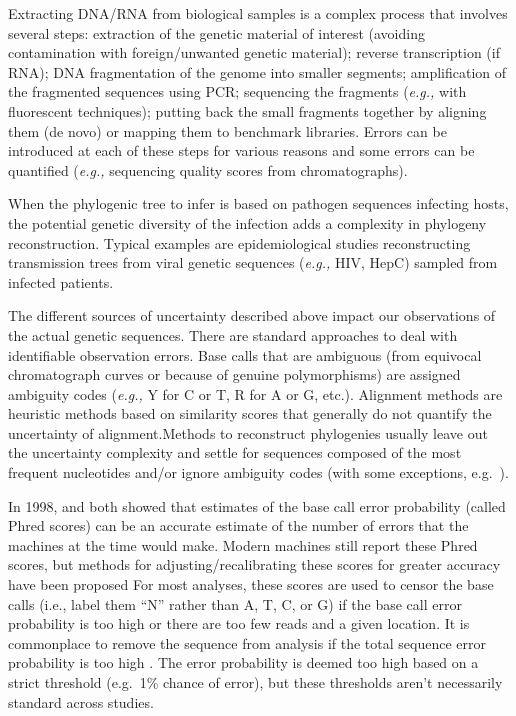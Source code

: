\documentclass[]{article}
\newcommand{\eg}{\textit{e.g.,}\xspace}
\begin{document}
Extracting DNA/RNA from biological samples is a complex process that
involves several steps: extraction of the genetic material of interest
(avoiding contamination with foreign/unwanted genetic material); reverse
transcription (if RNA); DNA fragmentation of the genome into smaller
segments; amplification of the fragmented sequences using PCR;
sequencing the fragments (\eg with fluorescent techniques); putting back
the small fragments together by aligning them (de novo) or mapping them
to benchmark libraries. Errors can be introduced at each of these steps
for various reasons \cite{beerenwinkelUltradeepSequencingAnalysis2011}
and some errors can be quantified (\eg sequencing quality scores from
chromatographs).

When the phylogenic tree to infer is based on pathogen sequences
infecting hosts, the potential genetic diversity of the infection adds a
complexity in phylogeny reconstruction. Typical examples are
epidemiological studies reconstructing transmission trees from viral
genetic sequences (\eg HIV, HepC) sampled from infected patients.

The different sources of uncertainty described above impact our
observations of the actual genetic sequences. There are standard
approaches to deal with identifiable observation errors. Base calls that
are ambiguous (from equivocal chromatograph curves or because of genuine
polymorphisms) are assigned ambiguity codes (\eg Y for C or T, R for A
or G, etc.). Alignment methods are heuristic methods based on similarity
scores that generally do not quantify the uncertainty of
alignment.Methods to reconstruct phylogenies usually leave out the
uncertainty complexity and settle for sequences composed of the most
frequent nucleotides and/or ignore ambiguity codes (with some
exceptions, e.g.~\citet{depristoFrameworkVariationDiscovery2011}).

In 1998, \citet{ewingBaseCallingAutomatedSequencer1998} and
\citet{richterichEstimationErrorsRaw1998} both showed that estimates of
the base call error probability (called Phred scores) can be an accurate
estimate of the number of errors that the machines at the time would
make. Modern machines still report these Phred scores, but methods for
adjusting/recalibrating these scores for greater accuracy have been
proposed \citep[\citet{depristoFrameworkVariationDiscovery2011},
\citet{liSNPDetectionMassively2009}]{liAdjustQualityScores2004} For most
analyses, these scores are used to censor the base calls (i.e., label
them ``N'' rather than A, T, C, or G) if the base call error probability
is too high or there are too few reads and a given location. It is
commonplace to remove the sequence from analysis if the total sequence
error probability is too high \citep[see,
e.g.,][\citet{robaskyRoleReplicatesError2014},
\citet{oraweAccountingUncertaintyDNA2015}]{doroninaPhylogeneticPositionEmended2005}.
The error probability is deemed too high based on a strict threshold
(e.g.~1\% chance of error), but these thresholds aren't necessarily
standard across studies.
\end{document}
